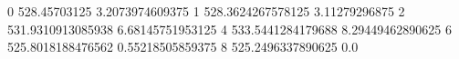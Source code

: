 0 528.45703125 3.2073974609375
1 528.3624267578125 3.11279296875
2 531.9310913085938 6.68145751953125
4 533.5441284179688 8.29449462890625
6 525.8018188476562 0.55218505859375
8 525.2496337890625 0.0
